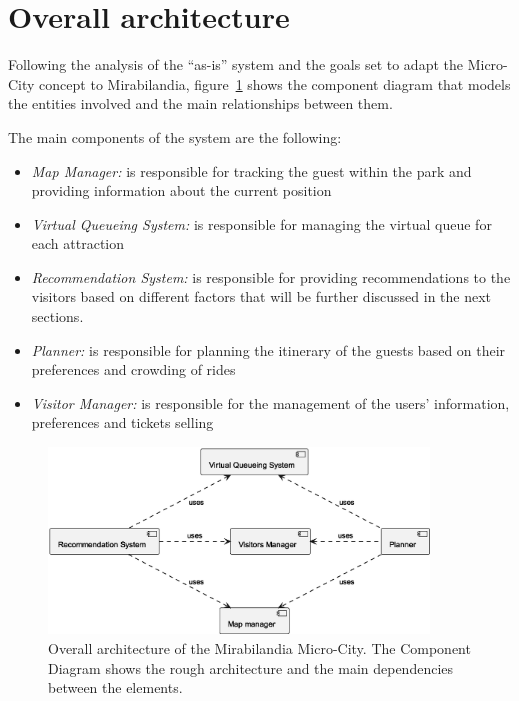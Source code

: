 \section{Overall architecture}\label{sec:mira-microcity}
Following the analysis of the ``as-is'' system and the goals set to adapt the Micro-City concept to Mirabilandia,
figure~\ref{fig:architecture-overview} shows the component diagram that models the entities involved and the main relationships between them.

The main components of the system are the following:

\begin{itemize}
	\item \textit{Map Manager:} is responsible for tracking the guest within the park and providing information about the current position
	\item \textit{Virtual Queueing System:} is responsible for managing the virtual queue for each attraction
	\item \textit{Recommendation System:} is responsible for providing recommendations to the visitors based on different factors that will be further discussed in the next sections.
	\item \textit{Planner:} is responsible for planning the itinerary of the guests based on their preferences and crowding of rides
	\item \textit{Visitor Manager:} is responsible for the management of the users' information, preferences and tickets selling
\end{itemize}

\begin{figure}[H]
	\centering
	\includegraphics[width=0.9\textwidth]{img/architecture-overview.eps}
	\caption{Overall architecture of the Mirabilandia Micro-City.
		The Component Diagram shows the rough architecture and the main dependencies between the elements.
	}
	\label{fig:architecture-overview}
\end{figure}

